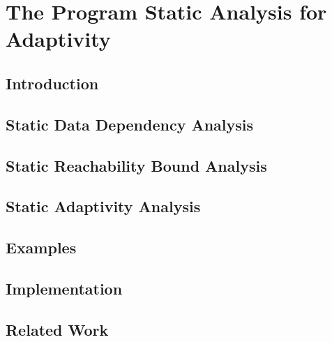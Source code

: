 \chapter{The Program Static Analysis for Adaptivity}
\label{ch:adapt-algo}


\section{Introduction}
\label{sec:static-intro}

\section{Static Data Dependency Analysis}
\label{sec:static-datadep}

\section{Static Reachability Bound Analysis}
\label{sec:static-reachability}

\section{Static Adaptivity Analysis}
\label{sec:static-adapt}

\section{Examples}
\label{sec:static-examples}
%
\section{Implementation}
\label{sec:static-implementation}

\section{Related Work}
\label{sec:static-relatedwork}
